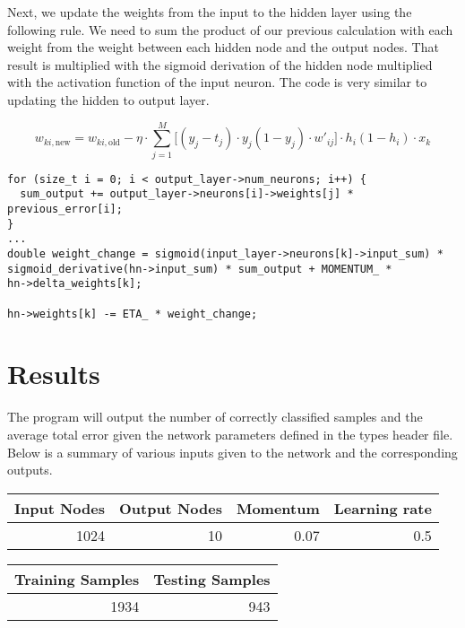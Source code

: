\documentclass[11pt]{article}
\begin{document}
Next, we update the weights from the input to the hidden layer using the following rule. We need to sum the product of our previous calculation with each  weight from the weight between each hidden node and the output nodes. That result is multiplied with the sigmoid derivation of the hidden node multiplied with the activation function of the input neuron. The code is very similar to updating the hidden to output layer.  

\[
w_{ki,\text{new}} = w_{ki,\text{old}} - \eta \cdot \sum\limits_{j=1}^{M}\bigg[
(y_j - t_j) \cdot
y_j(1-y_j) \cdot
w'_{ij}
\bigg] \cdot
h_i(1-h_i) \cdot
x_k
\]

\begin{verbatim}
for (size_t i = 0; i < output_layer->num_neurons; i++) {
  sum_output += output_layer->neurons[i]->weights[j] * previous_error[i];
}
...
double weight_change = sigmoid(input_layer->neurons[k]->input_sum) *
sigmoid_derivative(hn->input_sum) * sum_output + MOMENTUM_ *
hn->delta_weights[k];

hn->weights[k] -= ETA_ * weight_change;
\end{verbatim}

\section{Results}
\label{sec:orgheadline5}

The program will output the number of correctly classified samples and the average total error given the network parameters defined in the types header file. Below is a summary of various inputs given to the network and the corresponding outputs.

\begin{center}
\begin{tabular}{rrrr}
Input Nodes & Output Nodes & Momentum & Learning rate\\
\hline
1024 & 10 & 0.07 & 0.5\\
\end{tabular}
\end{center}

\begin{center}
\begin{tabular}{rr}
Training Samples & Testing Samples\\
\hline
1934 & 943\\
\end{tabular}
\end{center}
\end{document}
